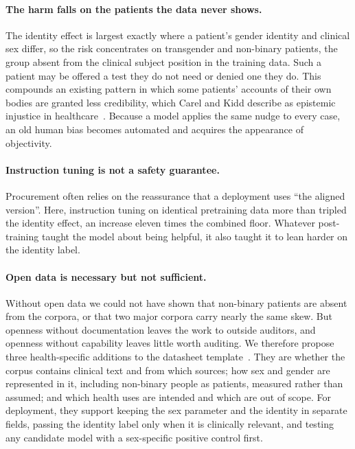 \documentclass[11pt,twocolumn]{article}
\begin{document}
\paragraph{The harm falls on the patients the data never shows.} The identity
effect is largest exactly where a patient's gender identity and clinical sex
differ, so the risk concentrates on transgender and non-binary patients, the
group absent from the clinical subject position in the training data. Such a
patient may be offered a test they do not need or denied one they do. This
compounds an existing pattern in which some patients' accounts of their own
bodies are granted less credibility, which Carel and Kidd describe as epistemic
injustice in healthcare~\cite{r28}. Because a model applies the same nudge to
every case, an old human bias becomes automated and acquires the appearance of
objectivity.

\paragraph{Instruction tuning is not a safety guarantee.} Procurement often
relies on the reassurance that a deployment uses ``the aligned version''. Here,
instruction tuning on identical pretraining data more than tripled the identity
effect, an increase eleven times the combined floor. Whatever
post-training taught the model about being helpful, it also taught it to lean
harder on the identity label.

\paragraph{Open data is necessary but not sufficient.} Without open data we
could not have shown that non-binary patients are absent from the corpora, or
that two major corpora carry nearly the same skew. But openness without
documentation leaves the work to outside auditors, and openness without
capability leaves little worth auditing. We therefore propose three
health-specific additions to the datasheet template~\cite{r1}. They are whether
the corpus contains clinical text and from which sources; how sex and gender are
represented in it, including non-binary people as patients, measured rather than
assumed; and which health uses are intended and which are out of scope. For
deployment, they support keeping the sex parameter and the identity in separate
fields, passing the identity label only when it is clinically relevant, and
testing any candidate model with a sex-specific positive control first.
\end{document}
